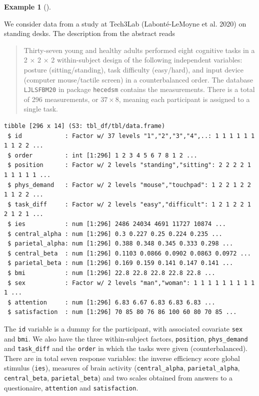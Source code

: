 \documentclass[
  11pt,
  letterpaper,
]{scrbook}
\theoremstyle{definition}
\newtheorem{example}{Example}[chapter]
\theoremstyle{definition}
\theoremstyle{remark}
\begin{document}
\begin{example}[]\protect\hypertarget{exm-standing-desks}{}\label{exm-standing-desks}

We consider data from a study at Tech3Lab (Labonté-LeMoyne et al. 2020)
on standing desks. The description from the abstract reads

\begin{quote}
Thirty-seven young and healthy adults performed eight cognitive tasks in
a 2 × 2 × 2 within-subject design of the following independent
variables: posture (sitting/standing), task difficulty (easy/hard), and
input device (computer mouse/tactile screen) in a counterbalanced order.
The database \texttt{LJLSFBM20} in package \texttt{hecedsm} contains the
measurements. There is a total of 296 measurements, or \(37 \times 8\),
meaning each participant is assigned to a single task.
\end{quote}

\begin{verbatim}
tibble [296 x 14] (S3: tbl_df/tbl/data.frame)
 $ id            : Factor w/ 37 levels "1","2","3","4",..: 1 1 1 1 1 1 1 1 2 2 ...
 $ order         : int [1:296] 1 2 3 4 5 6 7 8 1 2 ...
 $ position      : Factor w/ 2 levels "standing","sitting": 2 2 2 2 1 1 1 1 1 1 ...
 $ phys_demand   : Factor w/ 2 levels "mouse","touchpad": 1 2 2 1 2 2 1 1 2 2 ...
 $ task_diff     : Factor w/ 2 levels "easy","difficult": 1 2 1 2 2 1 2 1 2 1 ...
 $ ies           : num [1:296] 2486 24034 4691 11727 10874 ...
 $ central_alpha : num [1:296] 0.3 0.227 0.25 0.224 0.235 ...
 $ parietal_alpha: num [1:296] 0.388 0.348 0.345 0.333 0.298 ...
 $ central_beta  : num [1:296] 0.1103 0.0866 0.0902 0.0863 0.0972 ...
 $ parietal_beta : num [1:296] 0.169 0.159 0.141 0.147 0.141 ...
 $ bmi           : num [1:296] 22.8 22.8 22.8 22.8 22.8 ...
 $ sex           : Factor w/ 2 levels "man","woman": 1 1 1 1 1 1 1 1 1 1 ...
 $ attention     : num [1:296] 6.83 6.67 6.83 6.83 6.83 ...
 $ satisfaction  : num [1:296] 70 85 80 76 86 100 60 80 70 85 ...
\end{verbatim}

The \texttt{id} variable is a dummy for the participant, with associated
covariate \texttt{sex} and \texttt{bmi}. We also have the three
within-subject factors, \texttt{position}, \texttt{phys\_demand} and
\texttt{task\_diff} and the \texttt{order} in which the tasks were given
(counterbalanced). There are in total seven response variables: the
inverse efficiency score global stimulus (\texttt{ies}), measures of
brain activity (\texttt{central\_alpha}, \texttt{parietal\_alpha},
\texttt{central\_beta}, \texttt{parietal\_beta}) and two scales obtained
from answers to a questionaire, \texttt{attention} and
\texttt{satisfaction}.


\end{example}
\end{document}
